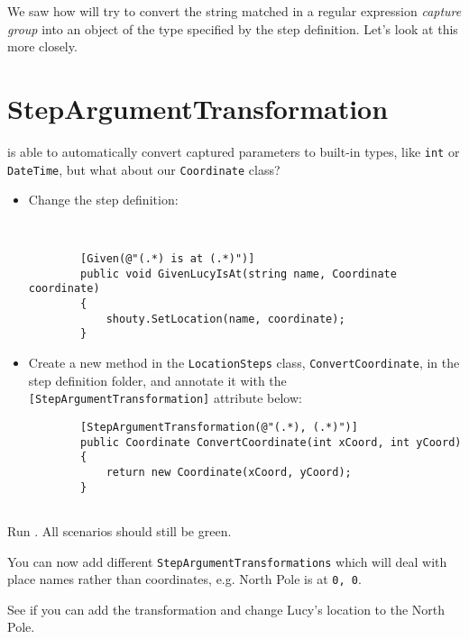 We saw how \CUKE{} will try to convert the string matched in a regular expression \emph{capture group} into an object of the type specified by the step definition. Let’s look at this more closely.

\section*{StepArgumentTransformation}

\CUKE{} is able to automatically convert captured parameters to built-in types, like \texttt{int} or \\ \texttt{DateTime}, but what about our \texttt{Coordinate} class?

\begin{itemize}
    \item Change the step definition:

        \begin{verbatim}
            
        
        [Given(@"(.*) is at (.*)")]
        public void GivenLucyIsAt(string name, Coordinate coordinate)
        {
            shouty.SetLocation(name, coordinate);
        }
        \end{verbatim}

\item Create a new method in the \texttt{LocationSteps} class, \texttt{ConvertCoordinate}, in the step definition folder, and annotate it with the \texttt{[StepArgumentTransformation]} attribute below:

    \begin{verbatim}
        [StepArgumentTransformation(@"(.*), (.*)")]
        public Coordinate ConvertCoordinate(int xCoord, int yCoord)
        {
            return new Coordinate(xCoord, yCoord);
        }
        
    \end{verbatim}
\end{itemize}    

Run \CUKE{}. All scenarios should still be green.


You can now add different \texttt{StepArgumentTransformations} which will deal with place names rather than coordinates, e.g. North Pole is at \texttt{0, 0}.

See if you can add the transformation and change Lucy's location to the North Pole.
